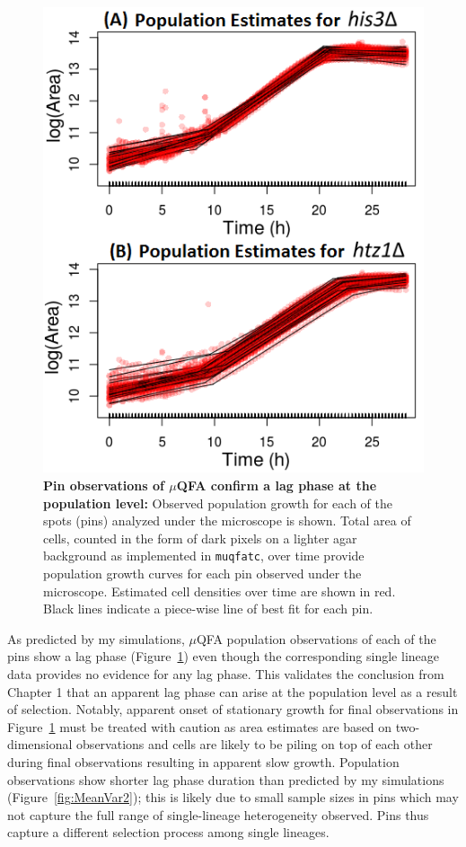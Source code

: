 \documentclass{bioinfo}
\begin{document}
{\setcounter{figure}{19}
\vspace{-2em}
\begin{figure}[H]
\centering
\includegraphics[width=0.75\linewidth]{Ch2PopEst.png}
\vspace{-0.5em}
\caption{\footnotesize{\textbf{Pin observations of $\mu$QFA confirm a lag phase at the population level:} Observed population growth for each of the spots (pins) analyzed under the microscope is shown. Total area of cells, counted in the form of dark pixels on a lighter agar background as implemented in \texttt{muqfatc}, over time provide population growth curves for each pin observed under the microscope. Estimated cell densities over time are shown in red. Black lines indicate a piece-wise line of best fit for each pin.}}
\label{fig:PopEst}
\vspace{-3em}
\end{figure}

As predicted by my simulations, $\mu$QFA population observations of each of the pins show a lag phase (Figure~\ref{fig:PopEst}) even though the corresponding single lineage data provides no evidence for any lag phase. This validates the conclusion from Chapter 1 that an apparent lag phase can arise at the population level as a result of selection. Notably, apparent onset of stationary growth for final observations in Figure~\ref{fig:PopEst} must be treated with caution as area estimates are based on two-dimensional observations and cells are likely to be piling on top of each other during final observations resulting in apparent slow growth. Population observations show shorter lag phase duration than predicted by my simulations (Figure~\ref{fig:MeanVar2}); this is likely due to small sample sizes in pins which may not capture the full range of single-lineage heterogeneity observed. Pins thus capture a different selection process among single lineages. 

}
\end{document}
